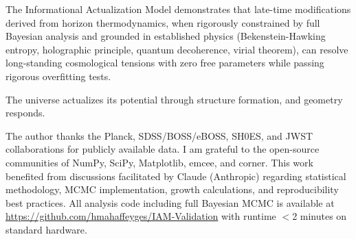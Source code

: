 \documentclass[twocolumn,superscriptaddress,prl,amsmath,amssymb]{revtex4-2}
\begin{document}
The Informational Actualization Model demonstrates that late-time modifications derived from horizon thermodynamics, when rigorously constrained by full Bayesian analysis and grounded in established physics (Bekenstein-Hawking entropy, holographic principle, quantum decoherence, virial theorem), can resolve long-standing cosmological tensions with zero free parameters while passing rigorous overfitting tests.

The universe actualizes its potential through structure formation, and geometry responds.

\begin{acknowledgments}
The author thanks the Planck, SDSS/BOSS/eBOSS, SH0ES, and JWST collaborations for publicly available data. I am grateful to the open-source communities of NumPy, SciPy, Matplotlib, emcee, and corner. This work benefited from discussions facilitated by Claude (Anthropic) regarding statistical methodology, MCMC implementation, growth calculations, and reproducibility best practices. All analysis code including full Bayesian MCMC is available at \url{https://github.com/hmahaffeyges/IAM-Validation} with runtime $<$2 minutes on standard hardware.
\end{acknowledgments}
\end{document}
